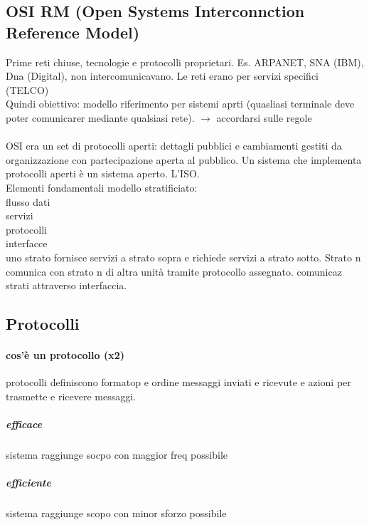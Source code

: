 \documentclass[10pt]{article}
\begin{document}
\subsection{OSI RM (Open Systems Interconnction Reference Model)}
Prime reti chiuse, tecnologie e protocolli proprietari. Es. ARPANET, SNA (IBM), Dna (Digital), non intercomunicavano. Le reti erano per servizi specifici (TELCO)\\
Quindi obiettivo: modello riferimento per sistemi aprti (quasliasi terminale deve poter comunicarer mediante qualsiasi rete). $\rightarrow$ accordarsi sulle regole\\\\
OSI era un set di protocolli aperti: dettagli pubblici e cambiamenti gestiti da organizzazione con partecipazione aperta al pubblico. Un sistema che implementa protocolli aperti è un sistema aperto. L'ISO.\\
Elementi fondamentali modello stratificiato:\\
flusso dati\\servizi\\protocolli\\interfacce\\
uno strato fornisce servizi a strato sopra e richiede servizi a strato sotto. Strato n comunica con strato n di altra unità tramite protocollo assegnato. comunicaz strati attraverso interfaccia.\\

\subsection{Protocolli}
\paragraph{cos'è un protocollo (x2)} protocolli definiscono formatop e ordine messaggi inviati e ricevute e azioni per trasmette e ricevere messaggi.
\subparagraph{efficace} sistema raggiunge socpo con maggior freq possibile
\subparagraph{efficiente} sistema raggiunge scopo con minor sforzo possibile
\end{document}
